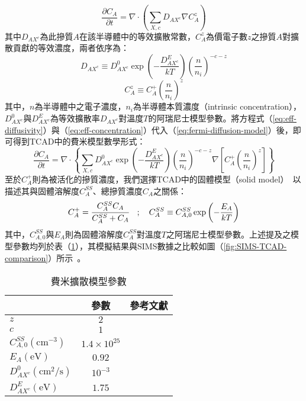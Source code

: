 \begin{equation}
\frac{\partial C_A}{\partial t}=\nabla\cdot\left(\sum_{X,c}D_{AX^c}\nabla C_A^z\right)\label{eq:fermi-diffusion-model}
\end{equation}
其中$D_{AX^c}$為此摻質$A$在該半導體中的等效擴散常數，$C_A^z$為價電子數$z$之摻質$A$對擴散貢獻的等效濃度，兩者依序為：
\begin{equation}
D_{AX^c}\equiv D_{AX^c}^0\exp\left(-\frac{D_{AX^c}^E}{kT}\right)\left(\frac{n}{n_i}\right)^{-c-z}\label{eq:eff-diffusivity}
\end{equation}
\begin{equation}
C_A^z\equiv C_A^+\left(\frac{n}{n_i}\right)^z\label{eq:eff-concentration}
\end{equation}
其中，$n$為半導體中之電子濃度，$n_i$為半導體本質濃度（intrinsic concentration），$D_{AX^c}^0$與$D_{AX^c}^E$為等效擴散率$D_{AX^c}$對溫度$T$的阿瑞尼士模型參數。將方程式（\ref{eq:eff-diffusivity}）與（\ref{eq:eff-concentration}）代入（\ref{eq:fermi-diffusion-model}）後，即可得到TCAD中的費米模型數學形式：
\begin{equation}
\frac{\partial C_A}{\partial t}=\nabla\cdot\left\{\sum_{X,c}D_{AX^c}^0\exp\left(-\frac{D_{AX^c}^E}{kT}\right)\left(\frac{n}{n_i}\right)^{-c-z}\nabla\left[C_A^+\left(\frac{n}{n_i}\right)^z\right]\right\}
\end{equation}
至於$C_A^+$則為被活化的摻質濃度，我們選擇TCAD中的固體模型（solid model）~\cite{chang1964diffusion}\cite{process2016release}以描述其與固體溶解度$C_A^{SS}$、總摻質濃度$C_A$之關係：
\begin{equation}
C_A^+=\cfrac{C_A^{SS}C_A}{C_A^{SS}+C_A}\quad;\quad C_A^{SS}\equiv C_{A,0}^{SS}\exp\left(-\frac{E_A}{kT}\right)
\end{equation}
其中，$C_{A,0}^{SS}$與$E_A$則為固體溶解度$C_A^{SS}$對溫度$T$之阿瑞尼士模型參數。上述提及之模型參數均列於表（\ref{t:diffusion-parameter}），其模擬結果與SIMS數據之比較如圖（\ref{fig:SIMS-TCAD-comparison}）所示~\cite{knevzevic2016analysis}。
\begin{table}[h]
\begin{center}
\caption{費米擴散模型參數} \label{t:diffusion-parameter}
\begin{tabular}{lcc}

\hline
                    &  參數  & 參考文獻  \\
\hline
$z$ &  $2$ &   \\
$c$ & $1$ & \cite{knevzevic2016analysis} \\
$C_{A,0}^{SS}(\mathrm{cm}^{-3})$ & $1.4\times10^{25}$ & \cite{chang1964diffusion} \\
$E_A(\mathrm{eV})$ & $0.92$ & \cite{chang1964diffusion} \\
$D_{AX^c}^0(\mathrm{cm}^2/\mathrm{s})$ & $10^{-3}$ & \cite{knevzevic2016analysis} \\
$D_{AX^c}^E(\mathrm{eV})$ & $1.75$ & \cite{knevzevic2016analysis} \\
\hline

\end{tabular}
\end{center}
\end{table}
